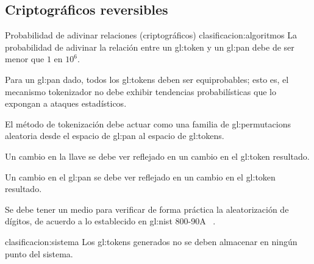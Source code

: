 %
%

\subsection{Criptográficos reversibles}

\requerimientoConClasificacion
{Probabilidad de adivinar relaciones (criptográficos)}
{clasificacion:algoritmos}
{
  La probabilidad de adivinar la relación entre un \gls{gl:token} y un
  \gls{gl:pan} debe de ser menor que $ 1 $ en $ 10^6 $.
}

{
  Para un \gls{gl:pan} dado, todos los \glspl{gl:token} deben ser
  equiprobables; esto es, el mecanismo tokenizador no debe exhibir
  tendencias probabilísticas que lo expongan a ataques estadísticos.
}

{
  El método de tokenización debe actuar como una familia de
  \glspl{gl:permutacion} aleatoria desde el espacio de \gls{gl:pan} al
  espacio de \glspl{gl:token}.
}

{
  Un cambio en la llave se debe ver reflejado en un cambio en el
  \gls{gl:token} resultado.
}

{
  Un cambio en el \gls{gl:pan} se debe ver reflejado en un cambio en el
  \gls{gl:token} resultado.
}

{
  Se debe tener un medio para verificar de forma práctica la aleatorización
  de dígitos, de acuerdo a lo establecido en \gls{gl:nist} 800-90A
 ~\cite{nist_aleatorios}.
}

{clasificacion:sistema}
{
  Los \glspl{gl:token} generados no se deben almacenar en ningún punto del
  sistema.
}

